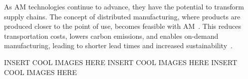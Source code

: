 As AM technologies continue to advance, they have the potential to transform supply chains. The concept of distributed manufacturing, where products are produced closer to the point of use, becomes feasible with AM~\cite{Jandyal.2022}. This reduces transportation costs, lowers carbon emissions, and enables on-demand manufacturing, leading to shorter lead times and increased sustainability~\cite{Haleem.2019}.



INSERT COOL IMAGES HERE\newline
INSERT COOL IMAGES HERE\newline
INSERT COOL IMAGES HERE\newline

